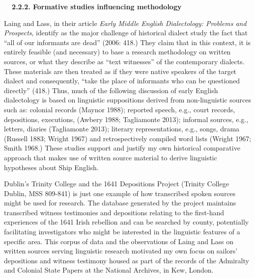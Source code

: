 \begin{styleStandard}
\textbf{\ \ 2.2.2. Formative studies influencing methodology}
\end{styleStandard}


\begin{styleStandard}
Laing and Lass, in their article \textit{Early Middle English Dialectology: Problems and Prospects}, identify as the major challenge of historical dialect study the fact that “all of our informants are dead” (2006: 418.) They claim that in this context, it is entirely feasible (and necessary) to base a research methodology on written sources, or what they describe as “text witnesses” of the contemporary dialects. These materials are then treated as if they were native speakers of the target dialect and consequently, “take the place of informants who can be questioned directly” (418.) Thus, much of the following discussion of early English dialectology is based on linguistic suppositions derived from non-linguistic sources such as: colonial records (Maynor 1988); reported speech, e.g., court records, depositions, executions, (Awbery 1988; Tagliamonte 2013); informal sources, e.g., letters, diaries (Tagliamonte 2013); literary representations, e.g., songs, drama (Russell 1883; Wright 1967) and retrospectively compiled word lists (Wright 1967; Smith 1968.) These studies support and justify my own historical comparative approach that makes use of written source material to derive linguistic hypotheses about Ship English. 
\end{styleStandard}


\begin{styleStandard}
Dublin’s Trinity College and the 1641 Depositions Project (Trinity College Dublin, MSS 809-841) is just one example of how transcribed spoken sources might be used for research. The database generated by the project maintains transcribed witness testimonies and depositions relating to the first-hand experiences of the 1641 Irish rebellion and can be searched by county, potentially facilitating investigators who might be interested in the linguistic features of a specific area. This corpus of data and the observations of Laing and Lass on written sources serving linguistic research motivated my own focus on sailors’ depositions and witness testimony housed as part of the records of the Admiralty and Colonial State Papers at the National Archives, in Kew, London. 
\end{styleStandard}


